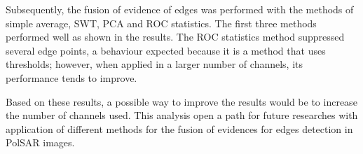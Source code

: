 \documentclass[conference]{IEEEtran}
\begin{document}
Subsequently, the fusion of evidence of edges was performed with the methods of simple average, SWT, PCA and ROC statistics. The first three methods performed well as shown in the results. The ROC statistics method suppressed several edge points, a behaviour expected because it is a method that uses thresholds; however, when applied in a larger number of channels, its performance tends to improve. 

Based on these results, a possible way to improve the results would be to increase the number of channels used. This analysis open a path for future researches with application of different methods for the fusion of evidences for edges detection in PolSAR images.


\end{document}
